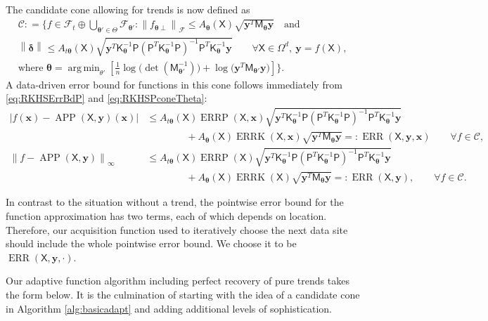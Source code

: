 \documentclass[]{mcom-l}
\theoremstyle{theorem}
\theoremstyle{remark}
\DeclareMathOperator*{\argmin}{arg\,min}
\DeclareMathOperator{\ERR}{ERR}
\DeclareMathOperator{\errP}{ERRP}
\DeclareMathOperator{\errK}{ERRK}
\DeclareMathOperator{\APP}{APP}
\newcommand{\mK}{\mathsf{K}}
\newcommand{\mM}{\mathsf{M}}
\newcommand{\mP}{\mathsf{P}}
\newcommand{\mX}{\mathsf{X}}
\newcommand{\bx}{{\boldsymbol{x}}}
\newcommand{\by}{{\boldsymbol{y}}}
\newcommand{\bdelta}{{\boldsymbol{\delta}}}
\newcommand{\btheta}{{\boldsymbol{\theta}}}
\newcommand{\calc}{{\mathcal{C}}}
\newcommand{\calf}{{\mathcal{F}}}
\def\abs#1{\ensuremath{\left \lvert #1 \right \rvert}}
\newcommand{\norm}[2][{}]{\ensuremath{\left \lVert #2 \right \rVert}_{#1}}
\newcommand{\bignorm}[2][{}]{\ensuremath{\bigl \lVert #2 \bigr \rVert}_{#1}}
\begin{document}
The candidate cone allowing for trends is now defined as
\begin{multline} \label{eq:RKHSPconeTheta}
\calc : = \biggl \{f \in \calf_t \oplus \bigcup_{\btheta' \in \Theta} \calf_{\btheta'} : 
\bignorm[\calf]{f_{\btheta \perp}} \le A_{\btheta}(\mX) \sqrt{\by^T \mM_\btheta \by} \quad \text{and} \\ 
\norm{\bdelta} \le A_{t \btheta}(\mX) \sqrt{\by^T \mK_\btheta^{-1}\mP (\mP^T \mK_\btheta^{-1} \mP)^{-1} \mP^T \mK_\btheta^{-1} \by} \qquad \forall \mX \in \Omega^d, \ \by = f(\mX),  \\
\text{where }\btheta = \argmin_{\theta'}  \left[\frac 1n \log \bigl( \det(\mM^{-1}_{\btheta'}) \bigr) + \log \bigl ( \by^T \mM_{\btheta'} \by \bigr)\right] \biggr \}.
\end{multline}
A data-driven error bound for functions in this cone follows immediately from \eqref{eq:RKHSErrBdP} and \eqref{eq:RKHSPconeTheta}:
\begin{subequations}  \label{eq:DataErrBdPoly}
\begin{align}
\abs{f(\bx) - \APP(\mX,\by)(\bx)}
& \le A_{t \btheta}(\mX) \errP(\mX,\bx) \sqrt{\by^T \mK_\btheta^{-1}\mP (\mP^T \mK_\btheta^{-1} \mP)^{-1} \mP^T \mK_\btheta^{-1} \by} \\
\nonumber
&\qquad \qquad + A_{\btheta}(\mX) \errK(\mX,\bx) \sqrt{\by^T \mM_\btheta \by} 
=:\ERR(\mX,\by,\bx) \qquad \forall f \in \calc,\\
\norm[\infty]{f - \APP(\mX,\by)}
& \le A_{t \btheta}(\mX) \errP(\mX) \sqrt{\by^T \mK_\btheta^{-1}\mP (\mP^T \mK_\btheta^{-1} \mP)^{-1} \mP^T \mK_\btheta^{-1} \by} \\
\nonumber
&\qquad \qquad + A_{\btheta}(\mX) \errK(\mX)  \sqrt{\by^T \mM_\btheta \by}  
=:\ERR(\mX,\by), \qquad \forall f \in \calc.
\end{align}
\end{subequations}

In contrast to the situation without a trend, the pointwise error bound for the function approximation has two terms, each of which depends on location.  Therefore, our acquisition function used to iteratively choose the next data site should include the whole pointwise error bound.  We choose it to be $\ERR(\mX,\by,\cdot)$.

Our adaptive function algorithm including perfect recovery of pure trends takes the  form below.  It is the culmination of starting with the idea of a candidate cone in Algorithm \ref{alg:basicadapt} and adding additional levels of sophistication.
\end{document}
